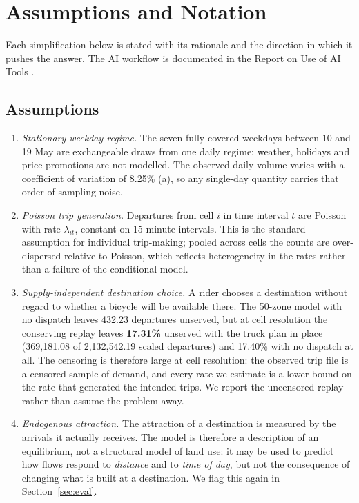\section{Assumptions and Notation}\label{sec:assume}

Each simplification below is stated with its rationale and the direction in
which it pushes the answer. The AI workflow is documented in the Report on Use of AI
Tools \cite{aiapp}.

\subsection{Assumptions}

\begin{enumerate}[label=\textbf{A\arabic*.},leftmargin=2.4em]
\item \emph{Stationary weekday regime.} The seven fully covered weekdays between 10
  and 19 May are exchangeable draws from one daily regime; weather, holidays and price
  promotions are not modelled. The observed daily volume varies with a coefficient of
  variation of 8.25\% (a), so any single-day quantity
  carries that order of sampling noise.

\item \emph{Poisson trip generation.} Departures from cell $i$ in time interval
  $t$ are Poisson with rate $\lambda_{it}$, constant on 15-minute intervals. This is
  the standard assumption for individual trip-making; pooled across cells the counts
  are over-dispersed relative to Poisson, which reflects heterogeneity in the rates
  rather than a failure of the conditional model.

\item \emph{Supply-independent destination choice.} A rider chooses a destination
  without regard to whether a bicycle will be available there. The 50-zone model with
  no dispatch leaves 432.23 departures unserved, but at cell resolution the conserving
  replay leaves \textbf{17.31\%} unserved with the truck plan in place (369,181.08 of
  2,132,542.19 scaled departures) and 17.40\% with no dispatch at all. The censoring is
  therefore large at cell resolution: the observed trip file is a censored sample of
  demand, and every rate we estimate is a lower bound on the rate that generated the
  intended trips. We report the uncensored replay rather than assume the problem away.

\item \emph{Endogenous attraction.} The attraction of a destination is measured by
  the arrivals it actually receives. The model is therefore a description of an
  equilibrium, not a structural model of land use: it may be used to predict how
  flows respond to \emph{distance} and to \emph{time of day}, but not the
  consequence of changing what is built at a destination. We flag this again in
  Section~\ref{sec:eval}.


\end{enumerate}
